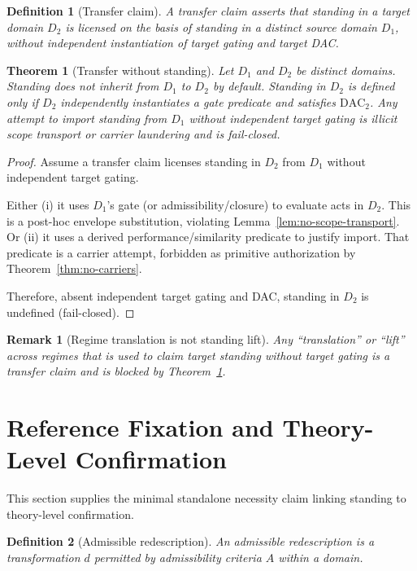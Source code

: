 \documentclass[12pt]{article}
\newtheorem{definition}{Definition}
\newtheorem{theorem}{Theorem}
\newtheorem{remark}{Remark}
\begin{document}
\begin{definition}[Transfer claim]
A \emph{transfer claim} asserts that standing in a target domain $D_2$ is licensed on the basis of standing in a distinct source domain $D_1$,
without independent instantiation of target gating and target DAC.
\end{definition}

\begin{theorem}[Transfer without standing]
\label{thm:tws}
Let $D_1$ and $D_2$ be distinct domains. Standing does not inherit from $D_1$ to $D_2$ by default.
Standing in $D_2$ is defined only if $D_2$ independently instantiates a gate predicate and satisfies $\mathrm{DAC}_2$.
Any attempt to import standing from $D_1$ without independent target gating is illicit scope transport or carrier laundering and is fail-closed.
\end{theorem}

\begin{proof}
Assume a transfer claim licenses standing in $D_2$ from $D_1$ without independent target gating.

Either (i) it uses $D_1$'s gate (or admissibility/closure) to evaluate acts in $D_2$. This is a post-hoc envelope substitution, violating Lemma~\ref{lem:no-scope-transport}.
Or (ii) it uses a derived performance/similarity predicate to justify import. That predicate is a carrier attempt, forbidden as primitive authorization by Theorem~\ref{thm:no-carriers}.

Therefore, absent independent target gating and DAC, standing in $D_2$ is undefined (fail-closed).
\end{proof}

\begin{remark}[Regime translation is not standing lift]
Any ``translation'' or ``lift'' across regimes that is used to claim target standing without target gating is a transfer claim and is blocked by Theorem~\ref{thm:tws}.
\end{remark}

\section{Reference Fixation and Theory-Level Confirmation}
\label{sec:ref}

This section supplies the minimal standalone necessity claim linking standing to theory-level confirmation.

\begin{definition}[Admissible redescription]
An \emph{admissible redescription} is a transformation $d$ permitted by admissibility criteria $A$ within a domain.
\end{definition}
\end{document}
